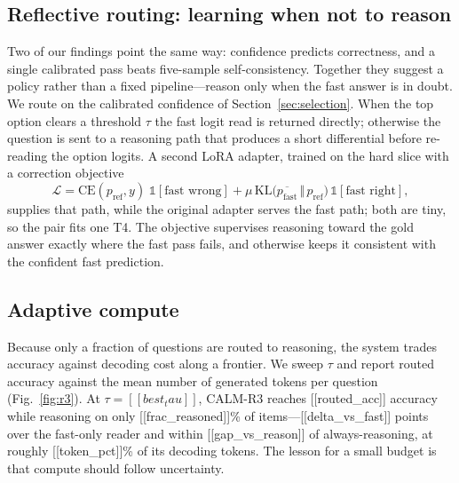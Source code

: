 
\subsection{Reflective routing: learning when not to reason}
Two of our findings point the same way: confidence predicts correctness, and a single
calibrated pass beats five-sample self-consistency. Together they suggest a policy rather
than a fixed pipeline---reason only when the fast answer is in doubt. We route on the
calibrated confidence of Section~\ref{sec:selection}. When the top option clears a
threshold $\tau$ the fast logit read is returned directly; otherwise the question is sent
to a reasoning path that produces a short differential before re-reading the option
logits. A second LoRA adapter, trained on the hard slice with a correction objective
\begin{equation}
\mathcal{L}=\mathrm{CE}(p_{\text{ref}},y)\;\mathbb{1}[\text{fast wrong}]
+\mu\,\mathrm{KL}\!\big(\overline{p_{\text{fast}}}\,\Vert\,p_{\text{ref}}\big)\,\mathbb{1}[\text{fast right}],
\end{equation}
supplies that path, while the original adapter serves the fast path; both are tiny, so the
pair fits one T4. The objective supervises reasoning toward the gold answer exactly where
the fast pass fails, and otherwise keeps it consistent with the confident fast prediction.

\subsection{Adaptive compute}
Because only a fraction of questions are routed to reasoning, the system trades accuracy
against decoding cost along a frontier. We sweep $\tau$ and report routed accuracy against
the mean number of generated tokens per question (Fig.~\ref{fig:r3}). At
$\tau=[[best_tau]]$, CALM-R3 reaches [[routed_acc]] accuracy while reasoning on only
[[frac_reasoned]]\% of items---[[delta_vs_fast]] points over the fast-only reader and
within [[gap_vs_reason]] of always-reasoning, at roughly [[token_pct]]\% of its decoding
tokens. The lesson for a small budget is that compute should follow uncertainty.

